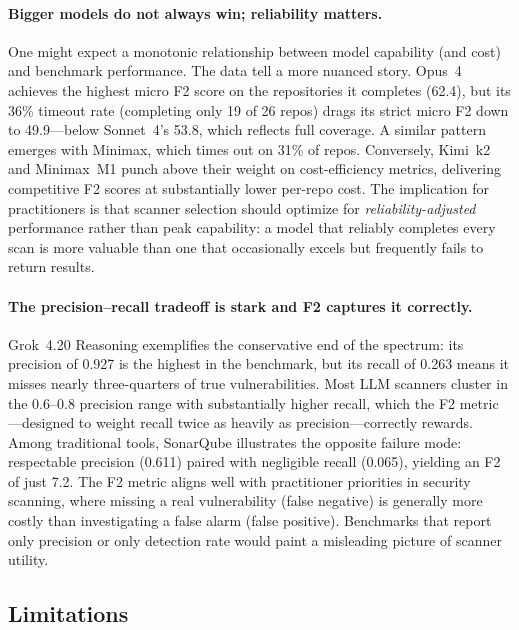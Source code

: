 \paragraph{Bigger models do not always win; reliability matters.}
One might expect a monotonic relationship between model capability
(and cost) and benchmark performance.  The data tell a more nuanced
story.  Opus~4 achieves the highest micro F2 score on the repositories
it completes (62.4), but its 36\% timeout rate (completing only 19 of 26
repos) drags its strict micro F2 down to 49.9---below Sonnet~4's 53.8,
which reflects full coverage.  A similar pattern emerges with
Minimax, which times out on 31\% of repos.  Conversely,
Kimi~k2 and Minimax~M1 punch above their weight on
cost-efficiency metrics, delivering competitive F2 scores at
substantially lower per-repo cost.  The implication for practitioners is
that scanner selection should optimize for \emph{reliability-adjusted}
performance rather than peak capability: a model that reliably completes
every scan is more valuable than one that occasionally excels but
frequently fails to return results.

\paragraph{The precision--recall tradeoff is stark and F2 captures it correctly.}
Grok~4.20 Reasoning exemplifies the conservative end of the spectrum:
its precision of 0.927 is the highest in the benchmark, but its recall
of 0.263 means it misses nearly three-quarters of true vulnerabilities.
Most LLM scanners cluster in the 0.6--0.8 precision range with
substantially higher recall, which the F2 metric---designed to weight
recall twice as heavily as precision---correctly rewards.  Among
traditional tools, SonarQube illustrates the opposite failure mode:
respectable precision (0.611) paired with negligible recall (0.065),
yielding an F2 of just 7.2.  The F2 metric aligns well with
practitioner priorities in security scanning, where missing a real
vulnerability (false negative) is generally more costly than
investigating a false alarm (false positive).  Benchmarks that report
only precision or only detection rate would paint a misleading picture
of scanner utility.

\subsection{Limitations}
\label{sec:limitations}

